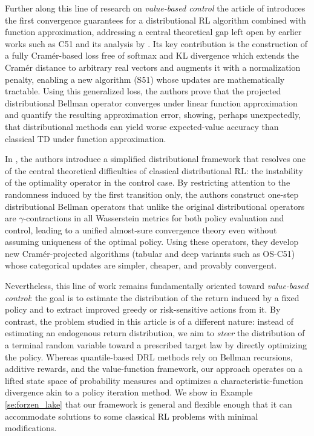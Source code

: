 \documentclass[reqno, 11pt]{amsart}%
\theoremstyle{definition}
\begin{document}
Further along this line of research on \emph{value-based control} the article of \cite{bellemare2020distributional} introduces the first convergence guarantees for a distributional RL algorithm combined with function approximation, addressing a central theoretical gap left open by earlier works such as C51 and its analysis by \cite{bellemare2017distributional}. Its key contribution is the construction of a fully Cram\'er-based loss free of softmax and KL divergence which extends the Cram\'er distance to arbitrary real vectors and augments it with a normalization penalty, enabling a new algorithm (S51) whose updates are mathematically tractable. Using this generalized loss, the authors prove that the projected distributional Bellman operator converges under linear function approximation and quantify the resulting approximation error, showing, perhaps unexpectedly, that distributional methods can yield worse expected-value accuracy than classical TD under function approximation. 

In \cite{achab2023onestepdistributionalreinforcementlearning}, the authors introduce a simplified distributional framework that resolves one of the central theoretical difficulties of classical distributional RL: the instability of the optimality operator in the control case. By restricting attention to the randomness induced by the first transition only, the authors construct one-step distributional Bellman operators that unlike the original distributional operators are $\gamma$-contractions in all Wasserstein metrics for both policy evaluation and control, leading to a unified almost-sure convergence theory even without assuming uniqueness of the optimal policy. Using these operators, they develop new Cram\'er-projected algorithms (tabular and deep variants such as OS-C51) whose categorical updates are simpler, cheaper, and provably convergent.

Nevertheless, this line of work remains fundamentally oriented toward \emph{value-based control}: the goal is to estimate the distribution of the return induced by a fixed policy and to extract improved greedy or risk-sensitive actions from it. By contrast, the problem studied in this article is of a different nature: instead of estimating an endogenous return distribution, we aim to \emph{steer} the distribution of a terminal random variable toward a prescribed target law by directly optimizing the policy. Whereas quantile-based DRL methods rely on Bellman recursions, additive rewards, and the value-function framework, our approach operates on a lifted state space of probability measures and optimizes a characteristic-function divergence akin to a policy iteration method. We show in Example \ref{se:forzen_lake} that our framework is general and flexible enough that it can accommodate solutions to some classical RL problems with minimal modifications. 
\end{document}
